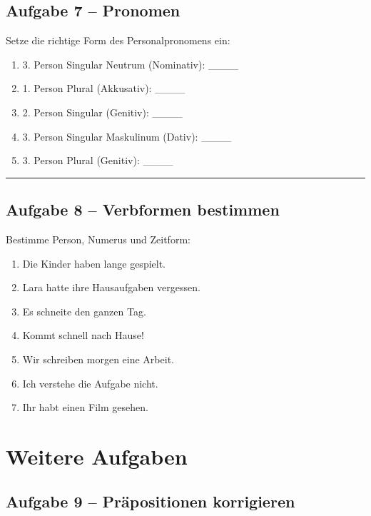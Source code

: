 \documentclass[a4paper,12pt]{article}
\newcommand{\linie}{\vspace{4pt}\hrule\vspace{10pt}}
\begin{document}
\subsection*{Aufgabe 7 – Pronomen}

Setze die richtige Form des Personalpronomens ein:

\begin{enumerate}
\item 3. Person Singular Neutrum (Nominativ): \_\_\_\_  
\item 1. Person Plural (Akkusativ): \_\_\_\_  
\item 2. Person Singular (Genitiv): \_\_\_\_  
\item 3. Person Singular Maskulinum (Dativ): \_\_\_\_  
\item 3. Person Plural (Genitiv): \_\_\_\_  
\end{enumerate}

\linie

\subsection*{Aufgabe 8 – Verbformen bestimmen}

Bestimme Person, Numerus und Zeitform:

\begin{enumerate}
\item Die Kinder haben lange gespielt.  
\item Lara hatte ihre Hausaufgaben vergessen.  
\item Es schneite den ganzen Tag.  
\item Kommt schnell nach Hause!  
\item Wir schreiben morgen eine Arbeit.  
\item Ich verstehe die Aufgabe nicht.  
\item Ihr habt einen Film gesehen.  
\end{enumerate}

\newpage
\section*{Weitere Aufgaben}

\subsection*{Aufgabe 9 – Präpositionen korrigieren}
\end{document}

